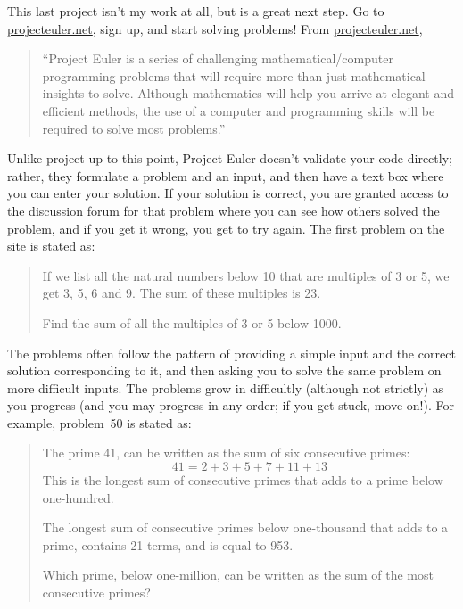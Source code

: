 \documentclass{article}
\begin{document}
This last project isn't my work at all, but is a great next step. Go
to \url{projecteuler.net}, sign up, and start solving problems! From
\url{projecteuler.net}, 
\begin{quote}
  \hspace{-.85em} ``Project Euler is a series of challenging
  mathematical/computer programming problems that will require more
  than just mathematical insights to solve. Although mathematics will
  help you arrive at elegant and efficient methods, the use of a
  computer and programming skills will be required to solve most
  problems.''
\end{quote}
Unlike project up to this point, Project Euler doesn't validate your
code directly; rather, they formulate a problem and an input, and then
have a text box where you can enter your solution. If your solution is
correct, you are granted access to the discussion forum for that
problem where you can see how others solved the problem, and if you
get it wrong, you get to try again. The first problem on the site is
stated as:
\begin{quote}
  If we list all the natural numbers below 10 that are multiples of 3
  or 5, we get 3, 5, 6 and 9. The sum of these multiples is 23.

  Find the sum of all the multiples of 3 or 5 below 1000.
\end{quote}
The problems often follow the pattern of providing a simple input and
the correct solution corresponding to it, and then asking you to solve
the same problem on more difficult inputs. The problems grow in
difficultly (although not strictly) as you progress (and you may
progress in any order; if you get stuck, move on!). For example,
problem~50 is stated as:
\begin{quote}
  The prime 41, can be written as the sum of six consecutive primes:
  \begin{equation*}
    41 = 2 + 3 + 5 + 7 + 11 + 13
  \end{equation*}
  This is the longest sum of consecutive primes that adds to a prime
  below one-hundred.

  The longest sum of consecutive primes below one-thousand that adds
  to a prime, contains 21 terms, and is equal to 953.

  Which prime, below one-million, can be written as the sum of the
  most consecutive primes?
\end{quote}
\end{document}
